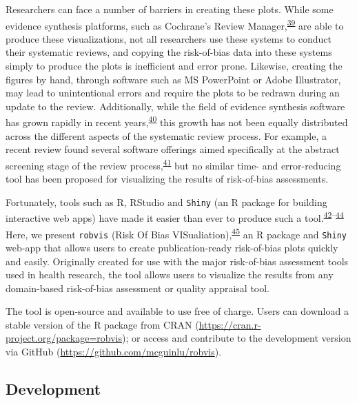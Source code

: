 \documentclass[a4paper, twoside]{templates/ociamthesis}
\begin{document}
Researchers can face a number of barriers in creating these plots. While some evidence synthesis platforms, such as Cochrane's Review Manager,\textsuperscript{\protect\hyperlink{ref-cochrane2014review}{39}} are able to produce these visualizations, not all researchers use these systems to conduct their systematic reviews, and copying the risk-of-bias data into these systems simply to produce the plots is inefficient and error prone. Likewise, creating the figures by hand, through software such as MS PowerPoint or Adobe Illustrator, may lead to unintentional errors and require the plots to be redrawn during an update to the review. Additionally, while the field of evidence synthesis software has grown rapidly in recent years,\textsuperscript{\protect\hyperlink{ref-marshall2015systematic}{40}} this growth has not been equally distributed across the different aspects of the systematic review process. For example, a recent review found several software offerings aimed specifically at the abstract screening stage of the review process,\textsuperscript{\protect\hyperlink{ref-harrison2020software}{41}} but no similar time- and error-reducing tool has been proposed for visualizing the results of risk-of-bias assessments.

Fortunately, tools such as R, RStudio and \texttt{Shiny} (an R package for building interactive web apps) have made it easier than ever to produce such a tool.\textsuperscript{\protect\hyperlink{ref-rref}{42}--\protect\hyperlink{ref-shinyref}{44}} Here, we present \texttt{robvis} (Risk Of Bias VISualiation),\textsuperscript{\protect\hyperlink{ref-mcguinness2019a}{45}} an R package and \texttt{Shiny} web-app that allows users to create publication-ready risk-of-bias plots quickly and easily. Originally created for use with the major risk-of-bias assessment tools used in health research, the tool allows users to visualize the results from any domain-based risk-of-bias assessment or quality appraisal tool.

The tool is open-source and available to use free of charge. Users can download a stable version of the R package from CRAN (\url{https://cran.r-project.org/package=robvis}); or access and contribute to the development version via GitHub (\url{https://github.com/mcguinlu/robvis}).

\hypertarget{development}{%
\subsection{Development}\label{development}}
\end{document}

